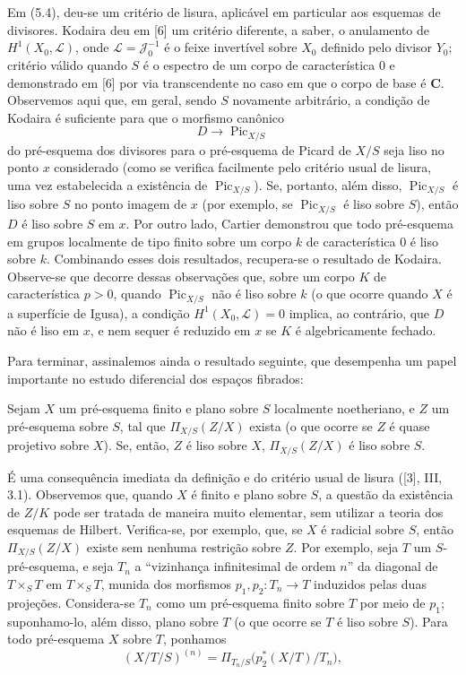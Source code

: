 Em (5.4), deu-se um critério de lisura, aplicável em particular aos esquemas de
divisores. Kodaira deu em [6] um critério diferente, a saber, o anulamento de
$H^1(X_0,\mathcal L)$, onde $\mathcal L=\mathcal J_0^{-1}$ é o feixe
invertível sobre $X_0$ definido pelo divisor $Y_0$; critério válido quando $S$
é o espectro de um corpo de característica 0 e demonstrado em [6] por via
transcendente no caso em que o corpo de base é $\mathbf C$. Observemos aqui
que, em geral, sendo $S$ novamente arbitrário, a condição de Kodaira é
suficiente para que o morfismo canônico
\[
D\longrightarrow\operatorname{Pic}_{X/S}
\]
do pré-esquema dos divisores para o pré-esquema de Picard de $X/S$ seja liso
no ponto $x$ considerado (como se verifica facilmente pelo critério usual de
lisura, uma vez estabelecida a existência de $\operatorname{Pic}_{X/S}$). Se,
portanto, além disso, $\operatorname{Pic}_{X/S}$ é liso sobre $S$ no ponto
imagem de $x$ (por exemplo, se $\operatorname{Pic}_{X/S}$ é liso sobre $S$),
então $D$ é liso sobre $S$ em $x$. Por outro lado, Cartier demonstrou que todo
pré-esquema em grupos localmente de tipo finito sobre um corpo $k$ de
característica 0 é liso sobre $k$. Combinando esses dois resultados, recupera-se
o resultado de Kodaira. Observe-se que decorre dessas observações que, sobre um
corpo $K$ de característica $p>0$, quando $\operatorname{Pic}_{X/S}$ não é
liso sobre $k$ (o que ocorre quando $X$ é a superfície de Igusa), a condição
$H^1(X_0,\mathcal L)=0$ implica, ao contrário, que $D$ não é liso em $x$, e
nem sequer é reduzido em $x$ se $K$ é algebricamente fechado.

Para terminar, assinalemos ainda o resultado seguinte, que desempenha um papel
importante no estudo diferencial dos espaços fibrados:

 Sejam $X$ um pré-esquema finito e plano sobre $S$
localmente noetheriano, e $Z$ um pré-esquema sobre $S$, tal que
$\Pi_{X/S}(Z/X)$ exista (o que ocorre se $Z$ é quase projetivo sobre $X$). Se,
então, $Z$ é liso sobre $X$, $\Pi_{X/S}(Z/X)$ é liso sobre $S$.

É uma consequência imediata da definição e do critério usual de lisura ([3],
III, 3.1). Observemos que, quando $X$ é finito e plano sobre $S$, a questão da
existência de $Z/K$ pode ser tratada de maneira muito elementar, sem
utilizar a teoria dos esquemas de Hilbert. Verifica-se, por exemplo, que, se
$X$ é radicial sobre $S$, então $\Pi_{X/S}(Z/X)$ existe sem nenhuma restrição
sobre $Z$. Por exemplo, seja $T$ um $S$-pré-esquema, e seja $T_n$ a
``vizinhança infinitesimal de ordem $n$'' da diagonal de $T\times_ST$ em
$T\times_ST$, munida dos morfismos $p_1,p_2:T_n\longrightarrow T$ induzidos
pelas duas projeções. Considera-se $T_n$ como um pré-esquema finito sobre $T$
por meio de $p_1$; suponhamo-lo, além disso, plano sobre $T$ (o que ocorre se
$T$ é liso sobre $S$). Para todo pré-esquema $X$ sobre $T$, ponhamos
\[
(X/T/S)^{(n)}=
\Pi_{T_n/S}\bigl(p_2^*(X/T)/T_n\bigr),
\]

